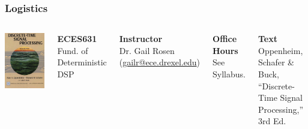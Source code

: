 \documentclass[mathserif,9pt]{beamer}
\begin{document}
\begin{frame}\frametitle{Logistics}\small
  \begin{columns}
      \begin{center}\includegraphics[width=.8\textwidth]{dtsp.jpg}\end{center}
    {\bf\color{blue!50!black}ECES631} \\
    Fund. of Deterministic DSP \\
    \vspace{1em}
    
    {\bf\color{blue!50!black}Instructor} \\
    Dr. Gail Rosen ({\color{blue}\url{gailr@ece.drexel.edu}}) \\
    \vspace{1em}
    
    {\bf\color{blue!50!black}Office Hours} \\
    See Syllabus. \\
    \vspace{1em}

    
    {\bf\color{blue!50!black}Text} \\
    Oppenheim, Schafer \& Buck, ``Discrete-Time Signal Processing,'' 3rd Ed.
    \vspace{1em}
    

\end{columns}
\end{frame}
\end{document}
